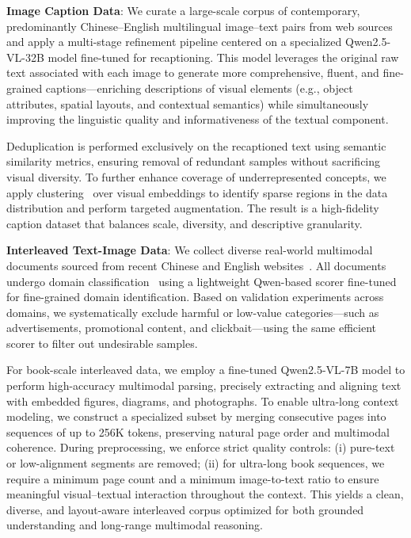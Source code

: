 \documentclass{article} %
\begin{document}
\textbf{Image Caption Data}:
We curate a large-scale corpus of contemporary, predominantly Chinese–English multilingual image–text pairs from web sources and apply a multi-stage refinement pipeline centered on a specialized Qwen2.5-VL-32B model fine-tuned for recaptioning. This model leverages the original raw text associated with each image to generate more comprehensive, fluent, and fine-grained captions—enriching descriptions of visual elements (e.g., object attributes, spatial layouts, and contextual semantics) while simultaneously improving the linguistic quality and informativeness of the textual component.

Deduplication is performed exclusively on the recaptioned text using semantic similarity metrics, ensuring removal of redundant samples without sacrificing visual diversity. To further enhance coverage of underrepresented concepts, we apply clustering~\citep{johnson2019billion,douze2024faiss,diao2025climb} over visual embeddings to identify sparse regions in the data distribution and perform targeted augmentation. The result is a high-fidelity caption dataset that balances scale, diversity, and descriptive granularity.

\textbf{Interleaved Text-Image Data}:
We collect diverse real-world multimodal documents sourced from recent Chinese and English websites~\citep{laurenccon2023obelics,zhu2023multimodal,li2024omnicorpus}. All documents undergo domain classification~\citep{wettig2025organize} using a lightweight Qwen-based scorer fine-tuned for fine-grained domain identification. Based on validation experiments across domains, we systematically exclude harmful or low-value categories—such as advertisements, promotional content, and clickbait—using the same efficient scorer to filter out undesirable samples.

For book-scale interleaved data, we employ a fine-tuned Qwen2.5-VL-7B model to perform high-accuracy multimodal parsing, precisely extracting and aligning text with embedded figures, diagrams, and photographs. To enable ultra-long context modeling, we construct a specialized subset by merging consecutive pages into sequences of up to 256K tokens, preserving natural page order and multimodal coherence. During preprocessing, we enforce strict quality controls:
(i) pure-text or low-alignment segments are removed;
(ii) for ultra-long book sequences, we require a minimum page count and a minimum image-to-text ratio to ensure meaningful visual–textual interaction throughout the context.
This yields a clean, diverse, and layout-aware interleaved corpus optimized for both grounded understanding and long-range multimodal reasoning.
\end{document}
